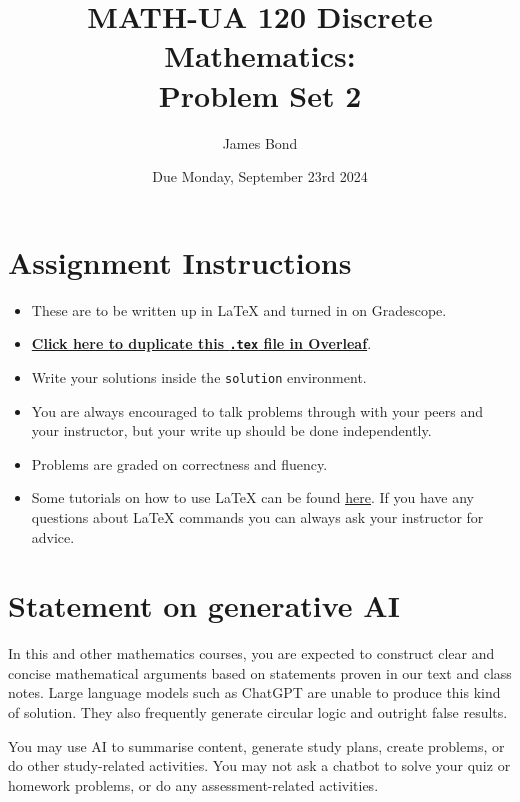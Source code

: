 \documentclass{article}
\title{\textbf{MATH-UA 120 Discrete Mathematics: \\ Problem Set 2}}
\author{%
    James Bond %
}
\date{Due Monday, September 23rd 2024} %
\theoremstyle{definition}
\begin{document}
\maketitle %

\vfill

\section*{Assignment Instructions}

\begin{itemize}
    \item These are to be written up in \LaTeX{} and turned in on Gradescope.
    \item \href{https://bit.ly/3XfKMtA}{\textbf{Click here to duplicate this \texttt{.tex} file in Overleaf}}.
    \item Write your solutions inside the \texttt{solution} environment.
    \item You are always encouraged to talk problems through with your peers and your instructor, but your write up should be done independently.
    \item Problems are graded on correctness and fluency.
    \item Some tutorials on how to use \LaTeX{} can be found \href{https://www.overleaf.com/learn/latex/Tutorials}{\underline{here}}. If you have any questions about \LaTeX{} commands you can always ask your instructor for advice.
\end{itemize}

\vfill

\section*{Statement on generative AI}

In this and other mathematics courses, you are expected to construct clear and concise mathematical arguments based on statements proven in our text and class notes. Large language models such as ChatGPT are unable to produce this kind of solution. They also frequently generate circular logic and outright false results.
 
You may use AI to summarise content, generate study plans, create problems, or do other study-related activities. You may not ask a chatbot to solve your quiz or homework problems, or do any assessment-related activities.
 
\end{document}
